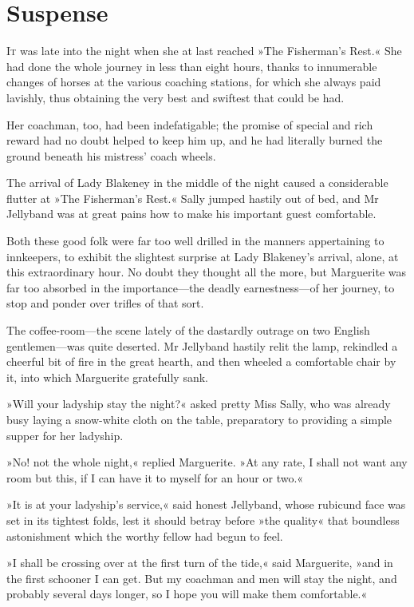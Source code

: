 
\chapter{Suspense}
\lettrine[lines=4]{I}{t} was late into the night when she at last reached »The Fisherman's Rest.« She had done the whole journey in less than eight hours, thanks to innumerable changes of horses at the various coaching stations, for which she always paid lavishly, thus obtaining the very best and swiftest that could be had.

Her coachman, too, had been indefatigable; the promise of special and rich reward had no doubt helped to keep him up, and he had literally burned the ground beneath his mistress' coach wheels.

The arrival of Lady Blakeney in the middle of the night caused a considerable flutter at »The Fisherman's Rest.« Sally jumped hastily out of bed, and Mr Jellyband was at great pains how to make his important guest comfortable.

Both these good folk were far too well drilled in the manners appertaining to innkeepers, to exhibit the slightest surprise at Lady Blakeney's arrival, alone, at this extraordinary hour. No doubt they thought all the more, but Marguerite was far too absorbed in the importance—the deadly earnestness—of her journey, to stop and ponder over trifles of that sort.

The coffee-room—the scene lately of the dastardly outrage on two English gentlemen—was quite deserted. Mr Jellyband hastily relit the lamp, rekindled a cheerful bit of fire in the great hearth, and then wheeled a comfortable chair by it, into which Marguerite gratefully sank.

»Will your ladyship stay the night?« asked pretty Miss Sally, who was already busy laying a snow-white cloth on the table, preparatory to providing a simple supper for her ladyship.

»No! not the whole night,« replied Marguerite. »At any rate, I shall not want any room but this, if I can have it to myself for an hour or two.«

»It is at your ladyship's service,« said honest Jellyband, whose rubicund face was set in its tightest folds, lest it should betray before »the quality« that boundless astonishment which the worthy fellow had begun to feel.

»I shall be crossing over at the first turn of the tide,« said Marguerite, »and in the first schooner I can get. But my coachman and men will stay the night, and probably several days longer, so I hope you will make them comfortable.«

